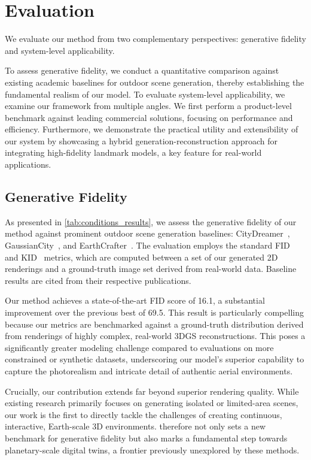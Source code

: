 \section{Evaluation}
\label{sec:result}

We evaluate our method from two complementary perspectives: generative fidelity and system-level applicability.

To assess generative fidelity, we conduct a quantitative comparison against existing academic baselines for outdoor scene generation, thereby establishing the fundamental realism of our model. To evaluate system-level applicability, we examine our framework from multiple angles. We first perform a product-level benchmark against leading commercial solutions, focusing on performance and efficiency. Furthermore, we demonstrate the practical utility and extensibility of our system by showcasing a hybrid generation-reconstruction approach for integrating high-fidelity landmark models, a key feature for real-world applications.

\subsection{Generative Fidelity}


As presented in \cref{tab:conditions_results}, we assess the generative fidelity of our method against prominent outdoor scene generation baselines: CityDreamer~\cite{CityDreamer}, GaussianCity~\cite{Xie_2025_CVPR}, and EarthCrafter~\cite{earthcrafter}. The evaluation employs the standard FID~\cite{NIPS2017_8a1d6947} and KID~\cite{binkowski2021demystifyingmmdgans} metrics, which are computed between a set of our generated 2D renderings and a ground-truth image set derived from real-world data. Baseline results are cited from their respective publications.

Our method achieves a state-of-the-art FID score of 16.1, a substantial improvement over the previous best of 69.5. This result is particularly compelling because our metrics are benchmarked against a ground-truth distribution derived from renderings of highly complex, real-world 3DGS reconstructions. This poses a significantly greater modeling challenge compared to evaluations on more constrained or synthetic datasets, underscoring our model's superior capability to capture the photorealism and intricate detail of authentic aerial environments.

Crucially, our contribution extends far beyond superior rendering quality. While existing research primarily focuses on generating isolated or limited-area scenes, our work is the first to directly tackle the challenges of creating continuous, interactive, Earth-scale 3D environments. \method{} therefore not only sets a new benchmark for generative fidelity but also marks a fundamental step towards planetary-scale digital twins, a frontier previously unexplored by these methods.


